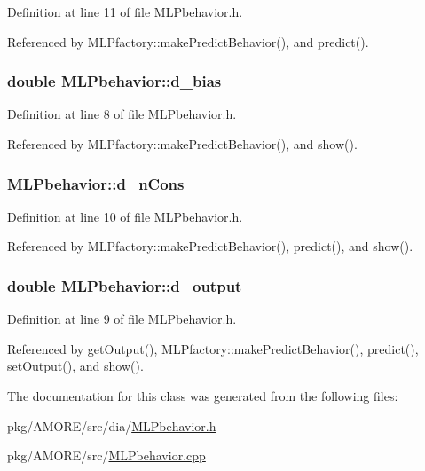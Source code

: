 Definition at line 11 of file MLPbehavior.h.



Referenced by MLPfactory::makePredictBehavior(), and predict().

\hypertarget{class_m_l_pbehavior_a6206785c5c3f838a0538f9f77fa7a25a}{
\subsubsection[{d\_\-bias}]{\setlength{\rightskip}{0pt plus 5cm}double {\bf MLPbehavior::d\_\-bias}}}
\label{class_m_l_pbehavior_a6206785c5c3f838a0538f9f77fa7a25a}


Definition at line 8 of file MLPbehavior.h.



Referenced by MLPfactory::makePredictBehavior(), and show().

\hypertarget{class_m_l_pbehavior_acb6e9681f06195ba1dd63bbafaa51d68}{
\subsubsection[{d\_\-nCons}]{ {\bf MLPbehavior::d\_\-nCons}}}
\label{class_m_l_pbehavior_acb6e9681f06195ba1dd63bbafaa51d68}


Definition at line 10 of file MLPbehavior.h.



Referenced by MLPfactory::makePredictBehavior(), predict(), and show().

\hypertarget{class_m_l_pbehavior_a1a2045f66e72cd110227735ac0930900}{
\subsubsection[{d\_\-output}]{\setlength{\rightskip}{0pt plus 5cm}double {\bf MLPbehavior::d\_\-output}}}
\label{class_m_l_pbehavior_a1a2045f66e72cd110227735ac0930900}


Definition at line 9 of file MLPbehavior.h.



Referenced by getOutput(), MLPfactory::makePredictBehavior(), predict(), setOutput(), and show().



The documentation for this class was generated from the following files:\begin{DoxyCompactItemize}
\item 
pkg/AMORE/src/dia/\hyperlink{_m_l_pbehavior_8h}{MLPbehavior.h}\item 
pkg/AMORE/src/\hyperlink{_m_l_pbehavior_8cpp}{MLPbehavior.cpp}\end{DoxyCompactItemize}
